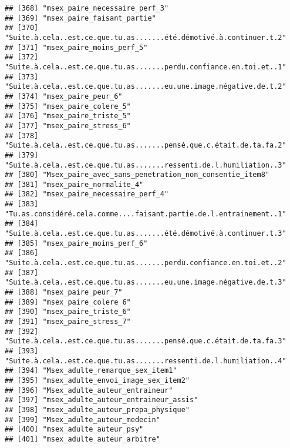 \documentclass[
]{article}
\begin{document}
\begin{verbatim}
## [368] "msex_paire_necessaire_perf_3"                                      
## [369] "msex_paire_faisant_partie"                                         
## [370] "Suite.à.cela..est.ce.que.tu.as.......été.démotivé.à.continuer.t.2" 
## [371] "msex_paire_moins_perf_5"                                           
## [372] "Suite.à.cela..est.ce.que.tu.as.......perdu.confiance.en.toi.et..1" 
## [373] "Suite.à.cela..est.ce.que.tu.as.......eu.une.image.négative.de.t.2" 
## [374] "msex_paire_peur_6"                                                 
## [375] "msex_paire_colere_5"                                               
## [376] "msex_paire_triste_5"                                               
## [377] "msex_paire_stress_6"                                               
## [378] "Suite.à.cela..est.ce.que.tu.as.......pensé.que.c.était.de.ta.fa.2" 
## [379] "Suite.à.cela..est.ce.que.tu.as.......ressenti.de.l.humiliation..3" 
## [380] "Msex_paire_avec_sans_penetration_non_consentie_item8"              
## [381] "msex_paire_normalite_4"                                            
## [382] "msex_paire_necessaire_perf_4"                                      
## [383] "Tu.as.considéré.cela.comme....faisant.partie.de.l.entrainement..1" 
## [384] "Suite.à.cela..est.ce.que.tu.as.......été.démotivé.à.continuer.t.3" 
## [385] "msex_paire_moins_perf_6"                                           
## [386] "Suite.à.cela..est.ce.que.tu.as.......perdu.confiance.en.toi.et..2" 
## [387] "Suite.à.cela..est.ce.que.tu.as.......eu.une.image.négative.de.t.3" 
## [388] "msex_paire_peur_7"                                                 
## [389] "msex_paire_colere_6"                                               
## [390] "msex_paire_triste_6"                                               
## [391] "msex_paire_stress_7"                                               
## [392] "Suite.à.cela..est.ce.que.tu.as.......pensé.que.c.était.de.ta.fa.3" 
## [393] "Suite.à.cela..est.ce.que.tu.as.......ressenti.de.l.humiliation..4" 
## [394] "Msex_adulte_remarque_sex_item1"                                    
## [395] "msex_adulte_envoi_image_sex_item2"                                 
## [396] "Msex_adulte_auteur_entraineur"                                     
## [397] "msex_adulte_auteur_entraineur_assis"                               
## [398] "msex_adulte_auteur_prepa_physique"                                 
## [399] "Msex_adulte_auteur_medecin"                                        
## [400] "msex_adulte_auteur_psy"                                            
## [401] "msex_adulte_auteur_arbitre"                                        

\end{verbatim}
\end{document}
